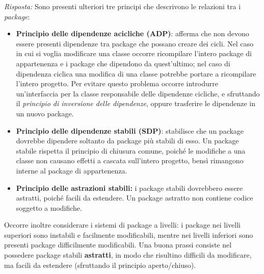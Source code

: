 \documentclass{article}
\newenvironment{solution}
    {\textit{Risposta:}}
    {}
\begin{document}
\begin{solution}
\newline
\newline
Sono presenti ulteriori tre principi che descrivono le relazioni tra i \textit{package}:
\begin{itemize}
	\item \textbf{Principio delle dipendenze acicliche (ADP)}: afferma che non devono essere presenti dipendenze tra package che possano creare dei cicli.
	Nel caso in cui si voglia modificare una classe occorre ricompilare l'intero package di appartenenza e i package che dipendono da quest'ultimo; nel caso di dipendenza ciclica una modifica di una classe potrebbe portare a ricompilare l'intero progetto.
	\newline
	Per evitare questo problema occorre introdurre un'interfaccia per la classe responsabile delle dipendenze cicliche, e sfruttando il \textit{principio di inversione delle dipendenze}, oppure trasferire le dipendenze in un nuovo package.
	\item \textbf{Principio delle dipendenze stabili (SDP)}: stabilisce che un package dovrebbe dipendere soltanto da package più stabili di esso.
	\newline
	Un package stabile rispetta il principio di chiusura comune, poiché le modifiche a una classe non causano effetti a cascata sull'intero progetto, bensì rimangono interne al package di appartenenza.
	\item \textbf{Principio delle astrazioni stabili:} i package stabili dovrebbero essere astratti, poiché facili da estendere. Un package astratto non contiene codice soggetto a modifiche.
\end{itemize}
Occorre inoltre considerare i sistemi di package a livelli: i package nei livelli superiori sono instabili e facilmente modificabili, mentre nei livelli inferiori sono presenti package difficilmente modificabili.
Una buona prassi consiste nel possedere package stabili \textbf{astratti}, in modo che risultino difficili da modificare, ma facili da estendere (sfruttando il principio aperto/chiuso).

\end{solution}
\end{document}

